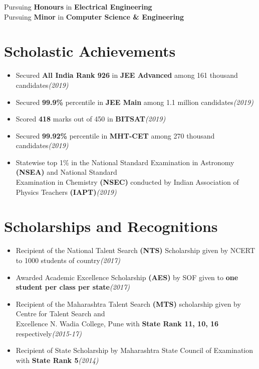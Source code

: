 \documentclass[a4paper]{article}
\newcommand{\rhsmall}[1]{\hfill{\footnotesize{\textsl{(#1)}}}}
\begin{document}
\thispagestyle{firstpage}
Pursuing \textbf{Honours} in \textbf{Electrical Engineering}\\
Pursuing \textbf{Minor} in \textbf{Computer Science \& Engineering}%
\section{Scholastic Achievements}
\begin{itemize}
	\item Secured \textbf{All India Rank 926} in \textbf{JEE Advanced} among 161 thousand candidates\rhsmall{2019}
	\item Secured \textbf{99.9\%} percentile in \textbf{JEE Main} among 1.1 million candidates\rhsmall{2019}
	\item Scored \textbf{418} marks out of 450 in \textbf{BITSAT}\rhsmall{2019}
	\item Secured \textbf{99.92\%} percentile in \textbf{MHT-CET} among 270 thousand candidates\rhsmall{2019}
	\item Statewise top 1\% in the National Standard Examination in Astronomy \textbf{(NSEA)} and National Standard\\Examination in Chemistry \textbf{(NSEC)} conducted by Indian Association of Physics Teachers \textbf{(IAPT)}\rhsmall{2019}
\end{itemize}
\section{Scholarships and Recognitions}
\begin{itemize}
	\item Recipient of the National Talent Search \textbf{(NTS)} Scholarship given by NCERT to 1000 students of country\rhsmall{2017}
	\item Awarded Academic Excellence Scholarship \textbf{(AES)} by SOF given to \textbf{one  student per class per state}\rhsmall{2017}
	\item Recipient of the Maharashtra Talent Search \textbf{(MTS)} scholarship given by Centre for Talent Search and \\Excellence N. Wadia College, Pune  with \textbf{State Rank 11, 10, 16} respectively\rhsmall{2015-17}
	\item Recipient of State Scholarship by Maharashtra State Council of Examination with \textbf{State Rank 5}\rhsmall{2014}
\end{itemize}
\end{document}
